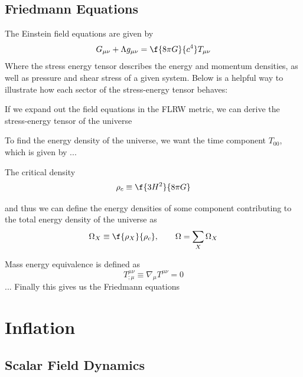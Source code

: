 \subsection{Friedmann Equations}


The Einstein field equations are given by
\begin{equation}
    G_{\mu\nu}+\Lambda g_{\mu\nu} =\f{8\pi G}{c^4}T_{\mu\nu}
\end{equation}
Where the stress energy tensor describes the energy and momentum densities, as well as pressure and shear stress of a given system. Below is a helpful way to illustrate how each sector of the stress-energy tensor behaves:

If we expand out the field equations in the FLRW metric, we can derive the stress-energy tensor of the universe


To find the energy density of the universe, we want the time component $T_{00}$, which is given by
...

The critical density
\begin{equation}
    \rho_c\equiv \f{3H^2}{8\pi G}
\end{equation}

and thus we can define the energy densities of some component contributing to the total energy density of the universe as
\begin{equation}
    \Omega_X\equiv \f{\rho_X}{\rho_c}, \qquad \Omega=\sum_X\Omega_X
\end{equation}


Mass energy equivalence is defined as
\begin{equation}
    T^{\mu\nu}_{;\mu}\equiv \nabla_\mu T^{\mu\nu}=0
\end{equation}
...
Finally this gives us the Friedmann equations


\newpage
\section{Inflation}
\label{sec:inflation}

\subsection{Scalar Field Dynamics}

